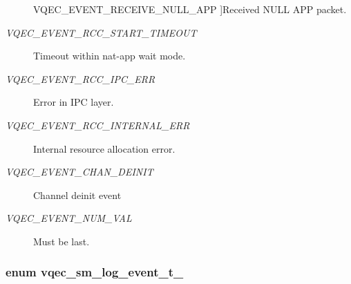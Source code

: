\begin{Desc}
\begin{description}
{VQEC\_\-EVENT\_\-RECEIVE\_\-NULL\_\-APP\label{vqec__sm_8h_bece8113c09a01fa04fbef2397e5672bd0511f17025a69e634877c40039d63e4}
}]Received NULL APP packet. \item[{\em 
VQEC\_\-EVENT\_\-RCC\_\-START\_\-TIMEOUT\label{vqec__sm_8h_bece8113c09a01fa04fbef2397e5672bbad04636fcfa82ab11a5b07ca2ab92b6}
}]Timeout within nat-app wait mode. \item[{\em 
VQEC\_\-EVENT\_\-RCC\_\-IPC\_\-ERR\label{vqec__sm_8h_bece8113c09a01fa04fbef2397e5672b5d2d1a57d327541bce354958881be9f5}
}]Error in IPC layer. \item[{\em 
VQEC\_\-EVENT\_\-RCC\_\-INTERNAL\_\-ERR\label{vqec__sm_8h_bece8113c09a01fa04fbef2397e5672bbcd9a7b663c2eece71d3f3acdbf5eeca}
}]Internal resource allocation error. \item[{\em 
VQEC\_\-EVENT\_\-CHAN\_\-DEINIT\label{vqec__sm_8h_bece8113c09a01fa04fbef2397e5672ba4181132b9c4c9e650b6f2b4cc473e41}
}]Channel deinit event \item[{\em 
VQEC\_\-EVENT\_\-NUM\_\-VAL\label{vqec__sm_8h_bece8113c09a01fa04fbef2397e5672b4d428a9412f3379762012741c3e876bd}
}]Must be last. \end{description}
\end{Desc}

\subsubsection{\setlength{\rightskip}{0pt plus 5cm}enum \bf{vqec\_\-sm\_\-log\_\-event\_\-t\_\-}}\label{vqec__sm_8h_e76cd31de78ec57a4b05bdccd29d38b6}


